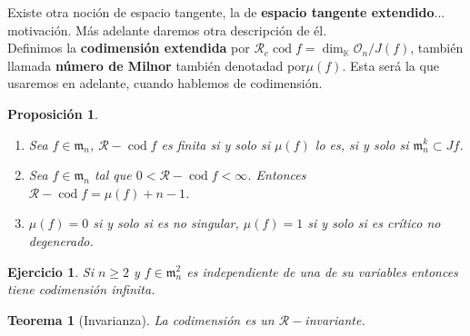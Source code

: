\documentclass[12pt]{book}
\newtheorem{eje}{Ejemplo}
\newtheorem{teo}{Teorema}
\newtheorem{pro}{Proposición}
\newtheorem{ex}{Ejercicio}
\newcommand{\rg}{\mathcal{R}}
\newcommand{\oo}{\mathcal{O}_n}
\newcommand{\mm}{\mathfrak{m}_n}
\newcommand{\cod}{\operatorname{cod}}
\begin{document}
Existe otra noción de espacio tangente, la de \textbf{espacio tangente extendido}... motivación. Más adelante daremos otra descripción de él.\\
Definimos la \textbf{codimensión extendida} por $\rg_e\cod f = \dim _{\mathbb{K}} \oo / J(f)$, también llamada \textbf{número de Milnor} también denotadad por$\mu(f)$. Esta será la que usaremos en adelante, cuando hablemos de codimensión.

\begin{pro}
\begin{enumerate}
\item Sea $f\in \mm$, $\rg-\cod f$ es finita si y solo si $\mu(f)$ lo es, si y solo si $\mm^k \subset J f$.
\item Sea $f\in \mm$ tal que $0< \rg-\cod f < \infty$. Entonces $\rg - \cod f = \mu (f) + n -1$.
\item $\mu (f)=0$ si y solo si es no singular, $\mu (f)=1$ si y solo si es crítico no degenerado.
\end{enumerate}
\end{pro}



\begin{ex}
Si $n \geq 2$ y $f\in \mm^2$ es independiente de una de su variables entonces tiene codimensión infinita.
\end{ex}


\begin{teo}[Invarianza]
La codimensión es un $\rg-$invariante.
\end{teo}




%
%
%
%
%
\end{document}
